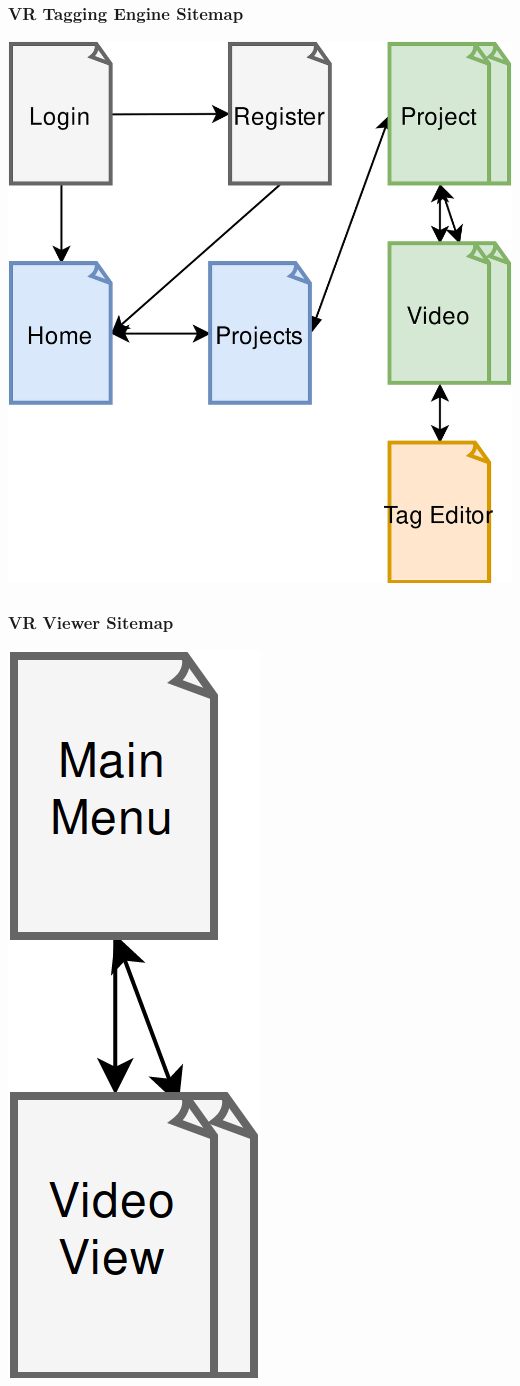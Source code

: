 \documentclass[12pt]{report}
\begin{document}
\subsubsection{VR Tagging Engine Sitemap}

\includegraphics[width=\textwidth]{web_site_map}

\subsubsection{VR Viewer Sitemap}

\includegraphics[height=\textwidth]{unity_site_map}
\end{document}
